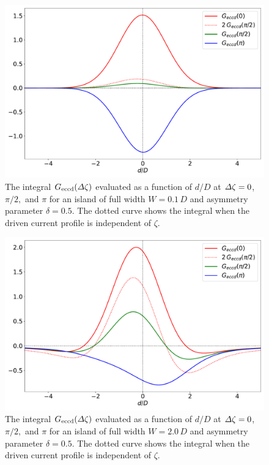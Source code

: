 \documentclass{iopjournal}
\begin{document}
\begin{figure}
\centerline{\includegraphics[width=\textwidth]{Fig9.pdf}}
\caption{The integral $G_{\rm eccd}({\mit\Delta}\zeta)$ evaluated as a function of $d/D$ at ${\mit\Delta}\zeta = 0$, $\pi/2,$ and $\pi$ for an  island
of full width $W=0.1\,D$ and asymmetry parameter $\delta=0.5$. The dotted curve shows the integral when the driven current profile is independent of $\zeta$. \label{fig7}}
\end{figure}

\begin{figure}
\centerline{\includegraphics[width=\textwidth]{Fig10.pdf}}
\caption{The integral $G_{\rm eccd}({\mit\Delta}\zeta)$ evaluated as a function of $d/D$ at ${\mit\Delta}\zeta = 0$, $\pi/2,$ and $\pi$  for an  island
of full width $W=2.0\,D$ and asymmetry parameter $\delta=0.5$. The dotted curve shows the integral when the driven current profile is independent of $\zeta$. \label{fig8}}
\end{figure}
\end{document}
